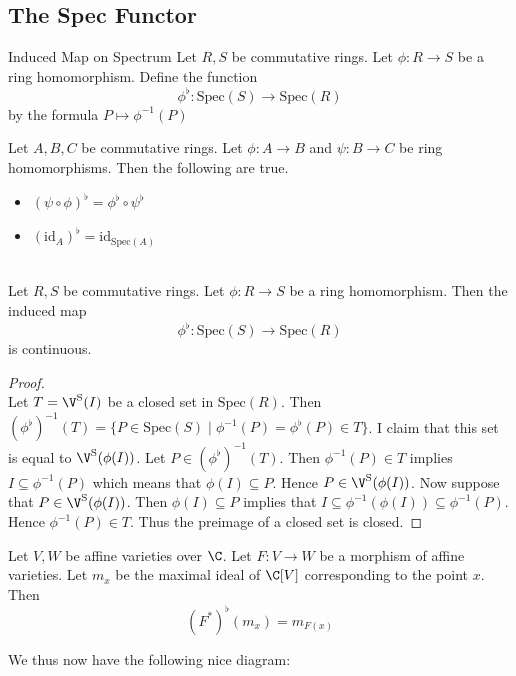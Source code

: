 \documentclass[a4paper]{article}
\begin{document}
\subsection{The Spec Functor}
\begin{defn}{Induced Map on Spectrum}{} Let $R,S$ be commutative rings. Let $\phi:R\to S$ be a ring homomorphism. Define the function $$\phi^\flat:\text{Spec}(S)\to\text{Spec}(R)$$ by the formula $P\mapsto\phi^{-1}(P)$
\end{defn}

\begin{prp}{}{} Let $A,B,C$ be commutative rings. Let $\phi:A\to B$ and $\psi:B\to C$ be ring homomorphisms. Then the following are true. 
\begin{itemize}
\item $(\psi\circ\phi)^\flat=\phi^\flat\circ\psi^\flat$
\item $(\text{id}_A)^\flat=\text{id}_{\text{Spec}(A)}$
\end{itemize}
\end{prp}

\begin{lmm}{}{}\\
Let $R,S$ be commutative rings. Let $\phi:R\to S$ be a ring homomorphism.  Then the induced map $$\phi^\flat:\text{Spec}(S)\to\text{Spec}(R)$$ is continuous. 
\begin{proof}\\
Let $T=\V^\text{S}(I)$ be a closed set in $\text{Spec}(R)$. Then $(\phi^\flat)^{-1}(T)=\{P\in\text{Spec}(S)\;|\;\phi^{-1}(P)=\phi^\flat(P)\in T\}$. I claim that this set is equal to $\V^\text{S}(\phi(I))$. Let $P\in(\phi^\flat)^{-1}(T)$. Then $\phi^{-1}(P)\in T$ implies $I\subseteq\phi^{-1}(P)$ which means that $\phi(I)\subseteq P$. Hence $P\in\V^\text{S}(\phi(I))$. Now suppose that $P\in\V^\text{S}(\phi(I))$. Then $\phi(I)\subseteq P$ implies that $I\subseteq\phi^{-1}(\phi(I))\subseteq\phi^{-1}(P)$. Hence $\phi^{-1}(P)\in T$. Thus the preimage of a closed set is closed. 
\end{proof}
\end{lmm}

\begin{prp}{}{} Let $V,W$ be affine varieties over $\C$. Let $F:V\to W$ be a morphism of affine varieties. Let $m_x$ be the maximal ideal of $\C[V]$ corresponding to the point $x$. Then $$(F^\ast)^\flat(m_x)=m_{F(x)}$$
\end{prp}

We thus now have the following nice diagram: \\
\\
\end{document}
